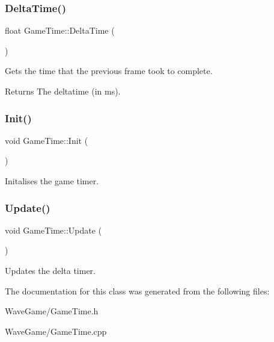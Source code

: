 \subsubsection{\texorpdfstring{Delta\+Time()}{DeltaTime()}}
{\footnotesize\ttfamily float Game\+Time\+::\+Delta\+Time (\begin{DoxyParamCaption}{ }\end{DoxyParamCaption})\hspace{0.3cm}{\ttfamily [static]}}



Gets the time that the previous frame took to complete. 

\begin{DoxyReturn}{Returns}
The deltatime (in ms).
\end{DoxyReturn}
\mbox{\label{class_game_time_a1f310e807ddb53d1a1278c4a0a2785ed}} 
\subsubsection{\texorpdfstring{Init()}{Init()}}
{\footnotesize\ttfamily void Game\+Time\+::\+Init (\begin{DoxyParamCaption}{ }\end{DoxyParamCaption})\hspace{0.3cm}{\ttfamily [static]}}



Initalises the game timer. 

\mbox{\label{class_game_time_a2d9927ce7e6cf48da7e8b48a4f1b917f}} 
\subsubsection{\texorpdfstring{Update()}{Update()}}
{\footnotesize\ttfamily void Game\+Time\+::\+Update (\begin{DoxyParamCaption}{ }\end{DoxyParamCaption})\hspace{0.3cm}{\ttfamily [static]}}



Updates the delta timer. 



The documentation for this class was generated from the following files\+:\begin{DoxyCompactItemize}
\item 
Wave\+Game/Game\+Time.\+h\item 
Wave\+Game/Game\+Time.\+cpp\end{DoxyCompactItemize}
